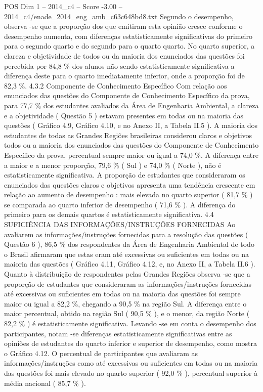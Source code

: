 \begin{textsample}{POS Dim 1 – 2014\_c4 – Score -3.00 – 2014\_c4/enade\_2014\_eng\_amb\_c63c648bd8.txt}
Segundo o desempenho, observa -se que a proporção dos que emitiram esta opinião cresce conforme o desempenho aumenta, com diferenças estatisticamente significativas do primeiro para o segundo quarto e do segundo para o quarto quarto.
No quarto superior, a clareza e objetividade de todos ou da maioria dos enunciados das questões foi percebida por 84,8 \% dos alunos não sendo estatisticamente significativa a diferença deste para o quarto imediatamente inferior, onde a proporção foi de 82,3 \%. 4.3.2 Componente de Conhecimento Específico Com relação aos enunciados das questões do Componente de Conhecimento Específico da prova, para 77,7 \% dos estudantes avaliados da Área de Engenharia Ambiental, a clareza e a objetividade ( Questão 5 ) estavam presentes em todas ou na maioria das questões ( Gráfico 4.9, Gráfico 4.10, e no Anexo II, a Tabela II.5 ).
A maioria dos estudantes de todas as Grandes Regiões brasileiras considerou claros e objetivos todos ou a maioria dos enunciados das questões do Componente de Conhecimento Específico da prova, percentual sempre maior ou igual a 74,0 \%.
A diferença entre a maior e a menor proporção, 79,6 \% ( Sul ) e 74,0 \% ( Norte ), não é estatisticamente significativa.
A proporção de estudantes que consideraram os enunciados das questões claros e objetivos apresenta uma tendência crescente em relação ao aumento de desempenho : mais elevada no quarto superior ( 81,7 \% ) se comparada ao quarto inferior de desempenho ( 71,6 \% ).
A diferença do primeiro para os demais quartos é estatisticamente significativa. 4.4 SUFICIÊNCIA DAS INFORMAÇÕES/INSTRUÇÕES FORNECIDAS Ao avaliarem as informações/instruções fornecidas para a resolução das questões ( Questão 6 ), 86,5 \% dos respondentes da Área de Engenharia Ambiental de todo o Brasil afirmaram que estas eram até excessivas ou suficientes em todas ou na maioria das questões ( Gráfico 4.11, Gráfico 4.12, e, no Anexo II, a Tabela II.6 ).
Quanto à distribuição de respondentes pelas Grandes Regiões observa -se que a proporção de estudantes que consideraram as informações/instruções fornecidas até excessivas ou suficientes em todas ou na maioria das questões foi sempre maior ou igual a 82,2 \%, chegando a 90,5 \% na região Sul.
A diferença entre o maior percentual, obtido na região Sul ( 90,5 \% ), e o menor, da região Norte ( 82,2 \% ) é estatisticamente significativa.
Levando -se em conta o desempenho dos participantes, notam -se diferenças estatisticamente significativas entre as opiniões de estudantes do quarto inferior e superior de desempenho, como mostra o Gráfico 4.12.
O percentual de participantes que avaliaram as informações/instruções como até excessivas ou suficientes em todas ou na maioria das questões foi mais elevado no quarto superior ( 92,0 \% ), percentual superior à média nacional ( 85,7 \% ).

\end{textsample}
